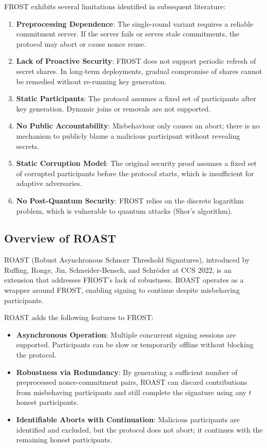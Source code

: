 FROST exhibits several limitations identified in subsequent literature:
\begin{enumerate}
    \item \textbf{Preprocessing Dependence}: The single-round variant requires a reliable commitment server. If the server fails or serves stale commitments, the protocol may abort or cause nonce reuse.
    \item \textbf{Lack of Proactive Security}: FROST does not support periodic refresh of secret shares. In long-term deployments, gradual compromise of shares cannot be remedied without re-running key generation.
    \item \textbf{Static Participants}: The protocol assumes a fixed set of participants after key generation. Dynamic joins or removals are not supported.
    \item \textbf{No Public Accountability}: Misbehaviour only causes an abort; there is no mechanism to publicly blame a malicious participant without revealing secrets.
    \item \textbf{Static Corruption Model}: The original security proof assumes a fixed set of corrupted participants before the protocol starts, which is insufficient for adaptive adversaries.
    \item \textbf{No Post-Quantum Security}: FROST relies on the discrete logarithm problem, which is vulnerable to quantum attacks (Shor's algorithm).
\end{enumerate}

\subsection{Overview of ROAST}

ROAST (Robust Asynchronous Schnorr Threshold Signatures), introduced by Ruffing, Ronge, Jin, Schneider-Bensch, and Schröder at CCS 2022, is an extension that addresses FROST's lack of robustness. ROAST operates as a wrapper around FROST, enabling signing to continue despite misbehaving participants.

ROAST adds the following features to FROST:
\begin{itemize}
    \item \textbf{Asynchronous Operation}: Multiple concurrent signing sessions are supported. Participants can be slow or temporarily offline without blocking the protocol.
    \item \textbf{Robustness via Redundancy}: By generating a sufficient number of preprocessed nonce-commitment pairs, ROAST can discard contributions from misbehaving participants and still complete the signature using any \(t\) honest participants.
    \item \textbf{Identifiable Aborts with Continuation}: Malicious participants are identified and excluded, but the protocol does not abort; it continues with the remaining honest participants.
\end{itemize}

